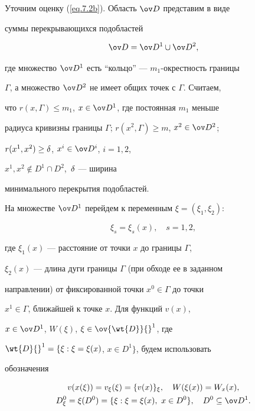 Уточним оценку (\ref{eq.7.2b}). Область $\od$ представим в виде


суммы перекрывающихся подобластей


\begin{equation}\label{eq.7.3}


\od=\od{}^1\cup\od{}^2,


\end{equation}


где множество $\od{}^1$ есть ``кольцо'' --- $m_1$-окрестность границы


$\varGamma$, а множество $\od{}^2$ не имеет общих точек с $\varGamma$. Считаем,


что $r(x,\varGamma)\leq m_1$, $x\in\od{}^1$, где постоянная $m_1$ меньше


радиуса кривизны границы $\varGamma$; $r(x^2,\varGamma)\geq m$, $x^2\in\od{}^2$;


$r(x^1,x^2)\geq\delta$, $x^i\in\od{}^i$, $i=1,2$,


$x^1,x^2\notin D^1\cap D^2$, $\,\delta$ --- ширина


минимального перекрытия подобластей.





На множестве $\od{}^1$ перейдем к переменным $\xi=(\xi_1,\xi_2)$:


$$


\xi_s=\xi_s(x),\quad s=1,2,


$$


где $\xi_1(x)$ --- расстояние от точки $x$ до границы $\varGamma$,


$\xi_2(x)$ --- длина дуги границы $\varGamma$ (при обходе ее в заданном


направлении) от фиксированной точки $x^0\in\varGamma$ до точки


$x^1\in\varGamma$, ближайшей к точке $x$. Для функций $v(x)$,


$x\in\od{}^1$, $W(\xi)$, $\xi\in\ov{\wt{D}}{}^1$, где


$\wt{D}{}^1=\{\xi:\xi=\xi(x)$, $x\in D^1\}$, будем использовать


обозначения


\begin{gather*}


v(x(\xi))=v_{\xi}(\xi)=\{v(x)\}_{\xi},\quad W(\xi(x))=W_x(x), \\


D^0_{\xi}=\xi(D^0)=\{\xi: \xi=\xi(x),\ x\in D^0\},


\quad D^0\subseteq\od{}^1. 


\end{gather*}


